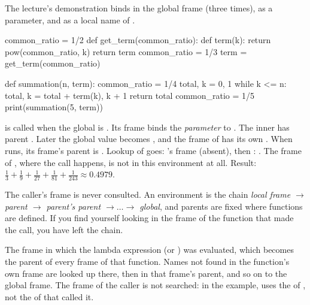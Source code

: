 \documentclass[10pt]{scrartcl}
\begin{document}
\begin{example*}
The lecture's demonstration binds  in the global frame (three times), as a parameter, and as a local name of .
\begin{py}
common_ratio = 1/2
def get_term(common_ratio):
    def term(k):
        return pow(common_ratio, k)
    return term
common_ratio = 1/3
term = get_term(common_ratio)

def summation(n, term):
    common_ratio = 1/4
    total, k = 0, 1
    while k <= n:
        total, k = total + term(k), k + 1
    return total
common_ratio = 1/5
print(summation(5, term))
\end{py}
\begin{steps}
  \ii {} is called when the global  is . Its frame  binds the \emph{parameter}  to . The inner  has parent .
  \ii Later the global value becomes , and the frame of  has its own .
  \ii When  runs, its frame's parent is . Lookup of  goes: 's frame (absent), then : . The frame of , where the call happens, is not in this environment at all.
  \ii Result: $\frac13+\frac19+\frac1{27}+\frac1{81}+\frac1{243}\approx0.4979$.
\end{steps}
\end{example*}
\begin{ideabox}
The caller's frame is never consulted. An environment is the chain \emph{local frame $\to$ parent $\to$ parent's parent $\to\dots\to$ global}, and parents are fixed where functions are defined. If you find yourself looking in the frame of the function that made the call, you have left the chain.
\end{ideabox}
\revisit The frame in which the lambda expression (or ) was evaluated, which becomes the parent of every frame of that function. Names not found in the function's own frame are looked up there, then in that frame's parent, and so on to the global frame. The frame of the caller is not searched: in the example,  uses the  of , not the  of  that called it.
\end{document}
